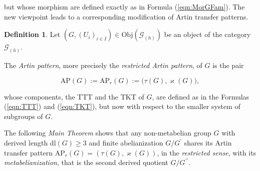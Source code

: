 \documentclass{amsart}
\theoremstyle{definition}
\newtheorem{definition}{Definition}[section]
\numberwithin{equation}{section}
\begin{document}
\noindent
but whose morphism are defined exactly as in Formula
(\ref{eqn:MorGFam}).
The new viewpoint leads to a
corresponding modification of Artin transfer patterns.


\begin{definition}
\label{dfn:RstrArtinPattern}
Let \((G,(U_i)_{i\in I})\in\mathrm{Obj}(\mathcal{G}_{(h)})\)
be an object of the category \(\mathcal{G}_{(h)}\).

\noindent
The \textit{Artin pattern}, more precisely the \textit{restricted Artin pattern}, of \(G\) is the pair

\begin{equation}
\label{eqn:RstrArtinPattern}
\mathrm{AP}(G):=\mathrm{AP}_r(G):=\bigl(\tau(G),\varkappa(G)\bigr),
\end{equation}

\noindent
whose components, the TTT and the TKT of \(G\), are defined as in the Formulas
(\ref{eqn:TTT})
and
(\ref{eqn:TKT}),
but now with respect to the smaller system of subgroups of \(G\).

\end{definition}



The following \textit{Main Theorem} shows that any non-metabelian group \(G\)
with derived length \(\mathrm{dl}(G)\ge 3\) and finite abelianization \(G/G^\prime\)
shares its Artin transfer pattern \(\mathrm{AP}_r(G)=(\tau(G),\varkappa(G))\),
in the \textit{restricted sense},
with its \textit{metabelianization}, that is the second derived quotient \(G/G^{\prime\prime}\).
\end{document}
